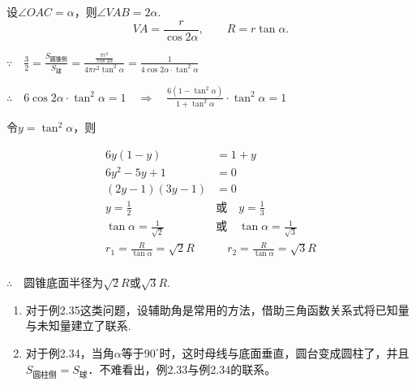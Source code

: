 \begin{solution}
设$\angle OAC=\alpha$，则$\angle VAB=2\alpha$.
\[VA=\frac{r}{\cos2\alpha},\qquad R=r\tan\alpha.\]

$\because\quad \frac{3}{2}=\frac{S_{\text{圆锥侧}}}{S_{\text{球}}}=\frac{\frac{\pi r^2}{\cos2\alpha}}{4\pi r^2\tan^2\alpha}=\frac{1}{4\cos2\alpha\cdot \tan^2\alpha}$

$\therefore\quad 6\cos2\alpha\cdot \tan^2\alpha=1 \quad \Rightarrow\quad \frac{6(1-\tan^2\alpha)}{1+\tan^2\alpha}\cdot \tan^2\alpha=1$

令$y=\tan^2\alpha$，则

\noindent
\begin{minipage}{.65\textwidth}\CTEXindent
    \[\begin{split}
        6y(1-y)&=1+y\\
    6y^2-5y+1&=0\\
    (2y-1)(3y-1)&=0\\
    y=\frac{1}{2}\quad &\text{或}\quad y=\frac{1}{3}\\
    \tan\alpha=\frac{1}{\sqrt{2}}\quad &\text{或}\quad \tan\alpha=\frac{1}{\sqrt{3}}\\
    r_1=\frac{R}{\tan\alpha}={\sqrt{2}}R\quad &\quad r_2=\frac{R}{\tan\alpha}={\sqrt{3}}R\\
    \end{split}\]
\end{minipage}
\hfill
\begin{minipage}{.3\textwidth}
\centering
{}
\end{minipage}
 
$\therefore\quad $圆锥底面半径为$\sqrt{2}R$或$\sqrt{3}R$.
\end{solution}

\begin{remark}
\begin{enumerate}
\item 对于例2.35这类问题，设辅助角是常用的方法，借助三角函数关系式将已知量与未知量建立了联系.
\item 对于例2.34，当角$\alpha$等于$90^{\circ}$时，这时母线与底面垂直，圆台变成圆柱了，并且$S_{\text{圆柱侧}}=S_{\text{球}}$．不难看出，例2.33与例2.34的联系。
\end{enumerate}
\end{remark}

